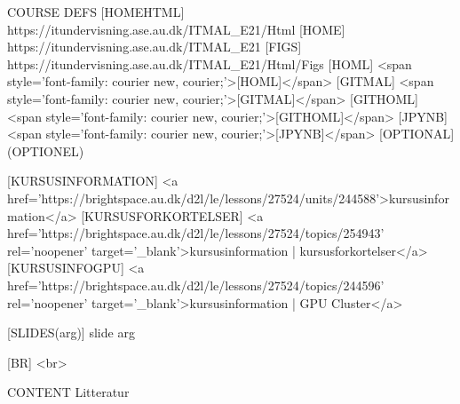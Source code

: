 COURSE
DEFS 
	[HOMEHTML] https://itundervisning.ase.au.dk/ITMAL_E21/Html
	[HOME]     https://itundervisning.ase.au.dk/ITMAL_E21
	[FIGS]     https://itundervisning.ase.au.dk/ITMAL_E21/Html/Figs
	[HOML]     <span style='font-family: courier new, courier;'>[HOML]</span>
	[GITMAL]   <span style='font-family: courier new, courier;'>[GITMAL]</span>
	[GITHOML]  <span style='font-family: courier new, courier;'>[GITHOML]</span>
	[JPYNB]    <span style='font-family: courier new, courier;'>[JPYNB]</span>
	[OPTIONAL] (OPTIONEL)

	[KURSUSINFORMATION]  <a href='https://brightspace.au.dk/d2l/le/lessons/27524/units/244588'>kursusinformation</a>
	[KURSUSFORKORTELSER] <a href='https://brightspace.au.dk/d2l/le/lessons/27524/topics/254943' rel='noopener' target='_blank'>kursusinformation | kursusforkortelser</a>
	[KURSUSINFOGPU]      <a href='https://brightspace.au.dk/d2l/le/lessons/27524/topics/244596' rel='noopener' target='_blank'>kursusinformation | GPU Cluster</a>

	[SLIDES(arg)]       slide arg

	[BR] <br>


CONTENT Litteratur





